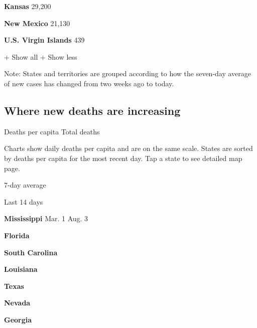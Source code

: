 \textbf{Kansas} 29,200

\href{https://www.nytimes.com/interactive/2020/us/new-mexico-coronavirus-cases.html}{}

\textbf{New Mexico} 21,130

\textbf{U.S. Virgin Islands} 439

+ Show all + Show less

Note: States and territories are grouped according to how the seven-day
average of new cases has changed from two weeks ago to today.

\hypertarget{where-new-deaths-are-increasing}{%
\subsection{Where new deaths are
increasing}\label{where-new-deaths-are-increasing}}

Deaths per capita Total deaths

Charts show daily deaths per capita and are on the same scale. States
are sorted by deaths per capita for the most recent day. Tap a state to
see detailed map page.

\href{https://www.nytimes.com/interactive/2020/us/mississippi-coronavirus-cases.html}{}

7-day average

Last 14 days

\textbf{Mississippi} Mar. 1 Aug. 3

\href{https://www.nytimes.com/interactive/2020/us/florida-coronavirus-cases.html}{}

\textbf{Florida}

\href{https://www.nytimes.com/interactive/2020/us/south-carolina-coronavirus-cases.html}{}

\textbf{South Carolina}

\href{https://www.nytimes.com/interactive/2020/us/louisiana-coronavirus-cases.html}{}

\textbf{Louisiana}

\href{https://www.nytimes.com/interactive/2020/us/texas-coronavirus-cases.html}{}

\textbf{Texas}

\href{https://www.nytimes.com/interactive/2020/us/nevada-coronavirus-cases.html}{}

\textbf{Nevada}

\href{https://www.nytimes.com/interactive/2020/us/georgia-coronavirus-cases.html}{}

\textbf{Georgia}

